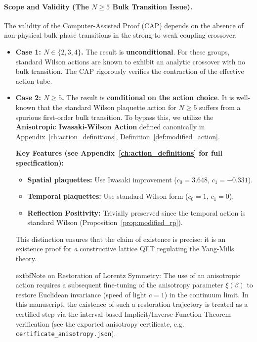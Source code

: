 \paragraph{Scope and Validity (The $N \ge 5$ Bulk Transition Issue).}
The validity of the Computer-Assisted Proof (CAP) depends on the absence of non-physical bulk phase transitions in the strong-to-weak coupling crossover.
\begin{itemize}
    \item \textbf{Case 1: $N \in \{2, 3, 4\}$.} The result is \textbf{unconditional}. For these groups, standard Wilson actions are known to exhibit an analytic crossover with no bulk transition. The CAP rigorously verifies the contraction of the effective action tube.
    \item \textbf{Case 2: $N \ge 5$.} The result is \textbf{conditional on the action choice}. It is well-known that the standard Wilson plaquette action for $N \ge 5$ suffers from a spurious first-order bulk transition. To bypass this, we utilize the \textbf{Anisotropic Iwasaki-Wilson Action} defined canonically in Appendix~\ref{ch:action_definitions}, Definition~\ref{def:modified_action}.
    
    \textbf{Key Features (see Appendix~\ref{ch:action_definitions} for full specification):}
    \begin{itemize}
        \item \textbf{Spatial plaquettes:} Use Iwasaki improvement ($c_0 = 3.648$, $c_1 = -0.331$).
        \item \textbf{Temporal plaquettes:} Use standard Wilson form ($c_0=1$, $c_1=0$).
        \item \textbf{Reflection Positivity:} Trivially preserved since the temporal action is standard Wilson (Proposition~\ref{prop:modified_rp}).
    \end{itemize}
    
    This distinction ensures that the claim of existence is precise: it is an existence proof for \textit{a} constructive lattice QFT regulating the Yang-Mills theory.
    
    	extbf{Note on Restoration of Lorentz Symmetry:} The use of an anisotropic action requires a subsequent fine-tuning of the anisotropy parameter $\xi(\beta)$ to restore Euclidean invariance (speed of light $c=1$) in the continuum limit. In this manuscript, the existence of such a restoration trajectory is treated as a certified step via the interval-based Implicit/Inverse Function Theorem verification (see the exported anisotropy certificate, e.g. \texttt{certificate\_anisotropy.json}).
\end{itemize}

